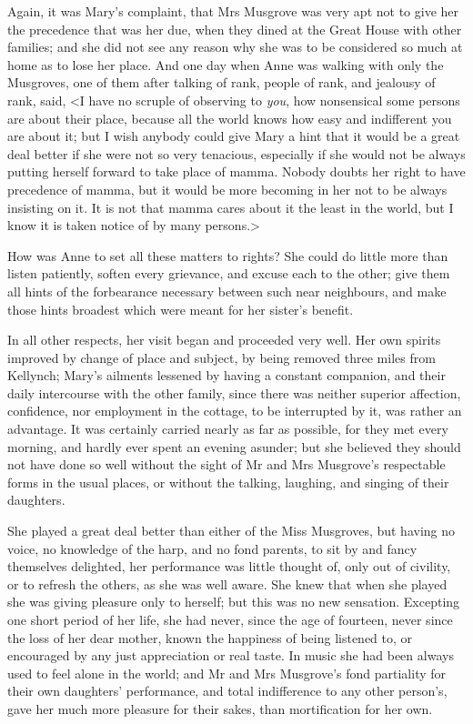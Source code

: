 Again, it was Mary's complaint, that Mrs Musgrove was very apt not to give her the precedence that was her due, when they dined at the Great House with other families; and she did not see any reason why she was to be considered so much at home as to lose her place. And one day when Anne was walking with only the Musgroves, one of them after talking of rank, people of rank, and jealousy of rank, said, <I have no scruple of observing to \textit{you}, how nonsensical some persons are about their place, because all the world knows how easy and indifferent you are about it; but I wish anybody could give Mary a hint that it would be a great deal better if she were not so very tenacious, especially if she would not be always putting herself forward to take place of mamma. Nobody doubts her right to have precedence of mamma, but it would be more becoming in her not to be always insisting on it. It is not that mamma cares about it the least in the world, but I know it is taken notice of by many persons.>

How was Anne to set all these matters to rights? She could do little more than listen patiently, soften every grievance, and excuse each to the other; give them all hints of the forbearance necessary between such near neighbours, and make those hints broadest which were meant for her sister's benefit.

In all other respects, her visit began and proceeded very well. Her own spirits improved by change of place and subject, by being removed three miles from Kellynch; Mary's ailments lessened by having a constant companion, and their daily intercourse with the other family, since there was neither superior affection, confidence, nor employment in the cottage, to be interrupted by it, was rather an advantage. It was certainly carried nearly as far as possible, for they met every morning, and hardly ever spent an evening asunder; but she believed they should not have done so well without the sight of Mr and Mrs Musgrove's respectable forms in the usual places, or without the talking, laughing, and singing of their daughters.

She played a great deal better than either of the Miss Musgroves, but having no voice, no knowledge of the harp, and no fond parents, to sit by and fancy themselves delighted, her performance was little thought of, only out of civility, or to refresh the others, as she was well aware. She knew that when she played she was giving pleasure only to herself; but this was no new sensation. Excepting one short period of her life, she had never, since the age of fourteen, never since the loss of her dear mother, known the happiness of being listened to, or encouraged by any just appreciation or real taste. In music she had been always used to feel alone in the world; and Mr and Mrs Musgrove's fond partiality for their own daughters' performance, and total indifference to any other person's, gave her much more pleasure for their sakes, than mortification for her own.

